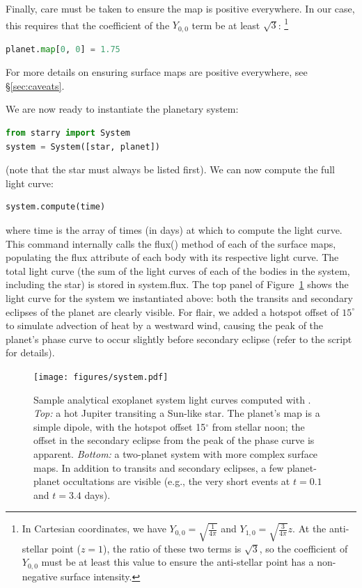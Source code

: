 \documentclass[modern]{aastex61}
\begin{document}
Finally, care must be taken to ensure the map is positive everywhere.
In our case, this requires that the coefficient of the $Y_{0,0}$ term be at least
$\sqrt{3}$:
\footnote{In Cartesian coordinates, we have $Y_{0,0} = \sqrt{\frac{1}{4\pi}}$ and
$Y_{1,0} = \sqrt{\frac{3}{4\pi}}z$. At the anti-stellar point ($z = 1$), the ratio
of these two terms is $\sqrt{3}$, so the coefficient of $Y_{0,0}$ must be at least
this value to ensure the anti-stellar point has a non-negative surface intensity.}
\begin{lstlisting}[language=Python,firstnumber=last]
planet.map[0, 0] = 1.75
\end{lstlisting}
%
For more details on ensuring surface maps are positive everywhere, see \S\ref{sec:caveats}.

We are now ready to instantiate the planetary system:
%
\begin{lstlisting}[language=Python,firstnumber=last]
from starry import System
system = System([star, planet])
\end{lstlisting}
%
(note that the star must always be listed first).
We can now compute the full light curve:
%
\begin{lstlisting}[language=Python,firstnumber=last]
system.compute(time)
\end{lstlisting}
%
where \textsf{time} is the array of times (in days) at which to compute the
light curve. This command internally calls the \textsf{flux()} method of each
of the surface maps, populating the \textsf{flux} attribute of each body
with its respective light curve. The total light curve (the sum of the
light curves of each of the bodies in the system, including the star) is
stored in \textsf{system.flux}. The top panel of Figure~\ref{fig:system} shows
the light curve for the system we instantiated above: both the transits
and secondary eclipses of the planet are clearly visible. For flair, we added
a hotspot offset of $15^\circ$ to simulate advection of heat by a
westward wind, causing the peak of the planet's phase curve to occur slightly
before secondary eclipse (refer to the \Python script for details).

%
\begin{figure}[ht]
    \begin{centering}
    \texttt{[image: figures/system.pdf]}
    \caption{\label{fig:system}
             Sample analytical exoplanet system light curves computed with \starry.
             \emph{Top:} a hot Jupiter
             transiting a Sun-like star. The planet's map is a simple dipole,
             with the hotspot offset 15$^\circ$ from stellar noon; the offset
             in the secondary eclipse from the peak of the phase curve is
             apparent. \emph{Bottom:} a two-planet system with more complex
             surface maps. In addition to transits and secondary eclipses,
             a few planet-planet occultations are visible (e.g., the very short
             events at $t=0.1$ and $t=3.4$ days).}
    \end{centering}
\end{figure}
%
\end{document}
